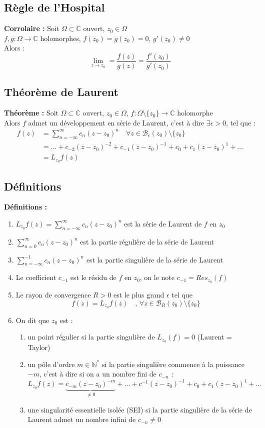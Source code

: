 \subsection{Règle de l'Hospital}
\textbf{Corrolaire :} Soit $\Omega\subset\mathbb{C}$ ouvert, $z_0\in\Omega$\\
$f,g : \Omega\to\mathbb{C}$ holomorphes, $f(z_0) = g(z_0) = 0$, $g'(z_0)\neq0$\\
Alors :
$$\lim_{z \to z_0} = \frac{f(z)}{g(z)} = \frac{f'(z_0)}{g'(z_0)}$$

\subsection{Théorème de Laurent}
\textbf{Théorème :} Soit $\Omega\subset\mathbb{C}$ ouvert, $z_0\in\Omega$, $f : \Omega\setminus\{z_0\}\to\mathbb{C}$ holomorphe\\
Alors $f$ admet un développement en série de Laurent, c'est à dire $\exists\epsilon>0$, tel que :
\begin{align*}
    f(z) &= \sum_{n=-\infty}^{\infty}c_n(z-z_0)^n \quad \forall z \in \mathcal{B}_\epsilon(z_0)\setminus\{z_0\} \\
    &=...+c_{-2}(z-z_0)^{-2}+c_{-1}(z-z_0)^{-1}+c_0+c_1(z-z_0)^1+... \\
    &= L_{z_0}f(z)
\end{align*}

\subsection{Définitions}
\textbf{Définitions :}
\begin{enumerate}
    \item $L_{z_0}f(z) = \sum_{n=-\infty}^{\infty}c_n(z-z_0)^n$ est la série de Laurent de $f$ en $z_0$
    \item $\sum_{n=0}^{\infty}c_n(z-z_0)^n$ est la partie régulière de la série de Laurent
    \item $\sum_{n=-\infty}^{-1}c_n(z-z_0)^n$ est la partie singulière de la série de Laurent
    \item Le coefficient $c_{-1}$ est le résidu de $f$ en $z_0$, on le note $c_{-1} = Res_{z_0}(f)$
    \item Le rayon de convergence $R>0$ est le plus grand $\epsilon$ tel que
    $$f(z) = L_{z_0}f(z) \quad \text{, } \forall z \in \mathcal{B}_R(z_0) \setminus \{z_0\}$$
    \item On dit que $z_0$ est :
    \begin{enumerate}
        \item un point régulier si la partie singulière de $L_{z_0}(f) = 0$ (Laurent = Taylor)
        \item un pôle d'ordre $m \in \mathbb{N}^*$ si la partie singulière commence à la puissance $-m$, c'est à dire si on a un nombre fini de $c_{-n}$ :
        $$L_{z_0}f(z) = \underbrace{c_{-m}(z-z_0)^{-m}}_{\neq0}+...+c^{-1}(z-z_0)^{-1}+c_0+c_1(z-z_0)^1+...$$
        \item une singularité essentielle isolée (SEI) si la partie singulière de la série de Laurent admet un nombre infini de $c_{-n} \neq 0$
    \end{enumerate}
\end{enumerate}


